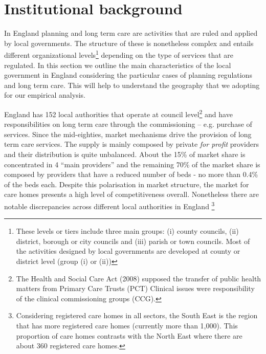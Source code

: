 \documentclass[12pt,letterpaper]{article}
\begin{document}
  \section{Institutional background}
  
  In England planning and long term care are activities that are ruled and applied by local governments. 
The structure of these is nonetheless complex and entails different organizational levels\footnote{These levels or tiers include three main groups: (i) county councils, (ii) district, borough or city councils and (iii) parish or 
town councils. Most of the activities designed by local governments are developed at county or district level 
(group (i) or (ii))} depending on the type of services that are regulated. 
In this section we outline the main characteristics of the local government in England 
considering the particular cases of planning regulations and long term care. 
This will help to understand the geography that we adopting for our empirical analysis. 
 
 England has 152 local authorities that operate at council level\footnote{The Health and Social Care Act (2008) 
supposed the transfer of public health matters from Primary Care Trusts (PCT) Clinical issues were responsibility of the clinical commissioning groups (CCG).} 
and have responsibilities on long term care through the commissioning – e.g. purchase of services.
 Since the mid-eighties, market mechanisms drive the provision of long term care services. The supply is mainly composed by private  \textit{for profit} providers and 
their distribution is quite unbalanced.  About the 15\% of market share is 
  concentrated in 4 “main providers” and the remaining 70\% of the market share is composed by providers 
  that have a reduced number of beds - no more than 0.4\% of the beds each.  
  Despite this polarisation in market structure, the market for care homes presents a high level of competitiveness overall.
  Nonetheless there are notable discrepancies
   across different local authorities in England \citep{forder2014, forder2011}\footnote{Considering registered care homes in all sectors, the South East is the region that has more registered care homes (currently more than 1,000). This proportion of care homes contrasts with the North East where there are about 360 registered care homes.}
 
\end{document}
